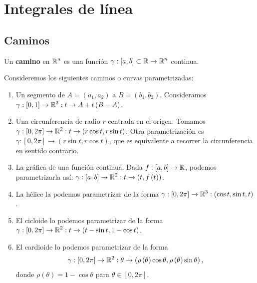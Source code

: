 \chapter{Integrales de línea}
\section{Caminos}
\begin{definition}[Camino]
	Un \textbf{camino} en $\displaystyle \mathbb{R}^{n} $ es una función $\displaystyle \gamma: \left[a,b\right] \subset\mathbb{R}  \to \mathbb{R}^{n} $ continua.
\end{definition}
\begin{eg}
Consideremos los siguientes caminos o curvas parametrizadas:
\begin{enumerate}
	\item Un segmento de $\displaystyle A=\left(a_{1}, a_{2}\right) $ a $\displaystyle B = \left(b_{1}, b_{2}\right) $. Consideramos $\displaystyle \gamma : \left[0,1\right] \to \mathbb{R}^{2} : t \to A + t\left(B-A\right) $. 
	\item Una circunferencia de radio $\displaystyle r $ centrada en el origen. Tomamos $\displaystyle \gamma : \left[0,2\pi \right] \to \mathbb{R}^{2} : t \to \left(r\cos t, r\sin t\right) $. Otra parametrización es $\displaystyle \gamma : \left[0,2\pi \right] \to \left(r\sin t, r \cos t\right) $, que es equivalente a recorrer la circunferencia en sentido contrario. 
	\item La gráfica de una función continua. Dada $\displaystyle f : \left[a,b\right] \to \mathbb{R} $, podemos parametrizarla así: $\displaystyle \gamma : \left[a,b\right] \to \mathbb{R}^{2} : t \to \left(t,f\left(t\right)\right) $. 
	\item La hélice la podemos parametrizar de la forma $\displaystyle \gamma : \left[0,2\pi \right] \to \mathbb{R}^{3} : \left(\cos t, \sin t, t\right) $. 
	\item El cicloide lo podemos parametrizar de la forma $\displaystyle \gamma : \left[0, 2\pi \right] \to \mathbb{R}^{2} : t \to \left(t-\sin t, 1- \cos t\right) $. 
	\item El cardioide lo podemos parametrizar de la forma
		\[\gamma : \left[0,2\pi \right] \to \mathbb{R}^{2} : \theta \to \left(\rho\left(\theta\right)\cos\theta, \rho\left(\theta\right)\sin \theta\right) ,\]
		donde $\displaystyle \rho\left(\theta \right)=1-\cos\theta  $ para $\displaystyle \theta\in \left[0,2\pi \right]  $. 
\end{enumerate}
\end{eg}

